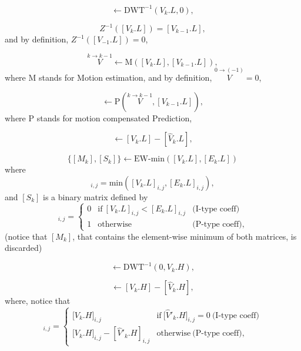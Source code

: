 \begin{equation}
  [V_k.L] \leftarrow \text{DWT}^{-1}(V_k.L, 0),
  \tag{E.a}
\end{equation}

\begin{equation}
  Z^{-1}([V_k.L]) = [V_{k-1}.L],
  \tag{E.b}
\end{equation}
and by definition, $Z^{-1}([V_{-1}.L]) = 0$,

\begin{equation}
  \overset{k\rightarrow k-1}{V} \leftarrow \text{M}([V_k.L], [V_{k-1}.L]),
  \tag{E.c}
\end{equation}
where M stands for Motion estimation, and by definition,
$\overset{0\rightarrow (-1)}{V}=0$,

\begin{equation}
  [\hat{V}_k.L] \leftarrow \text{P}(\overset{k\rightarrow k-1}{V}, [V_{k-1}.L]),
  \tag{E.d}
\end{equation}
where P stands for motion compensated Prediction,

\begin{equation}
  [E_k.L] \leftarrow [V_k.L] - [\hat{V}_k.L],
  \tag{E.e}
\end{equation}

\begin{equation}
  \{[M_k],[S_k]\} \leftarrow \text{EW-min}([V_k.L], [E_k.L])
  \tag{E.f}
\end{equation}
where
\begin{equation}
  [M_k]_{i,j}=\text{min}([V_k.L]_{i,j}, [E_k.L]_{i,j}),
\end{equation}
and $[S_k]$ is a binary matrix defined by
\begin{equation}
  [S_k]_{i,j} = \left\{
  \begin{array}{lll}
    0 & \text{if}~[V_k.L]_{i,j} < [E_k.L]_{i,j} & \text{(I-type coeff)} \\
    1 & \text{otherwise}                      & \text{(P-type coeff)},
  \end{array}
  \right.
  \label{eq:matrix}
\end{equation}
(notice that $[M_k]$, that contains the element-wise minimum of both
matrices, is discarded)

\begin{equation}
  [V_k.H] \leftarrow \text{DWT}^{-1}(0, V_k.H),
  \tag{b}
\end{equation}

\begin{equation}
  [E_k.H] \leftarrow [V_k.H] - [\hat{V}_k.H],
  \tag{c}
\end{equation}
where, notice that
\begin{equation}
  [E_k.H]_{i,j} = \left\{
  \begin{array}{ll}
    {[}V_k.H{]}_{i,j}                       & \text{if}~{[}\hat{V}'_k.H{]}_{i,j} = 0~\text{(I-type coeff)} \\
    {[}V_k.H{]}_{i,j} - [\hat{V}'_k.H]_{i,j} & \text{otherwise}~\text{(P-type coeff)},
  \end{array}
\right.
\end{equation}


